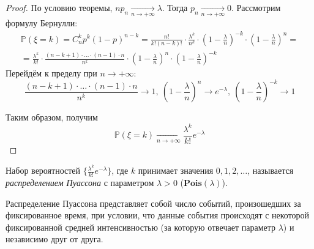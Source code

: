 \begin{proof}
    По условию теоремы, $n p_n \xrightarrow[n \to +\infty]{} \lambda$. Тогда $p_n \xrightarrow[n \to +\infty]{} 0$. Рассмотрим формулу Бернулли:
    \begin{multline*}
        \mathbb{P}(\xi = k) = C_n^k p^k (1 - p)^{n-k} = \frac{n!}{k!(n - k)!} \cdot \frac{\lambda^k}{n^k} \cdot \left(1 - \frac{\lambda}{n}\right)^{-k} \cdot \left(1 - \frac{\lambda}{n}\right)^n = \\
        = \frac{\lambda^k}{k!} \cdot \frac{(n - k + 1) \cdot \ldots \cdot (n - 1) \cdot n}{n^k} \cdot \left(1 - \frac{\lambda}{n}\right)^n \cdot \left(1 - \frac{\lambda}{n}\right)^{-k}
    \end{multline*}
    Перейдём к пределу при $n \to +\infty$:
    \begin{equation*}
        \frac{(n - k + 1) \cdot \ldots \cdot (n - 1) \cdot n}{n^k} \to 1,~ \left(1 - \frac{\lambda}{n}\right)^n \to e^{-\lambda},~ \left(1 - \frac{\lambda}{n}\right)^{-k} \to 1
    \end{equation*}
    
    Таким образом, получим
    \begin{equation*}
        \mathbb{P}(\xi = k) \xrightarrow[n \to +\infty]{} \frac{\lambda^k}{k!} e^{-\lambda}
    \end{equation*}
\end{proof}

\begin{defn}
    Набор вероятностей $\{\frac{\lambda^k}{k!} e^{-\lambda} \}$, где $k$ принимает значения $0, 1, 2, \ldots$, называется {\it распределением Пуассона} с параметром $\lambda > 0$ ($\mathbf{Pois}(\lambda)$).
\end{defn}
\begin{rmrk}
    Распределение Пуассона представляет собой число событий, произошедших за фиксированное время, при условии, что данные события происходят с некоторой фиксированной средней интенсивностью (за которую отвечает параметр $\lambda$) и независимо друг от друга.
\end{rmrk}

